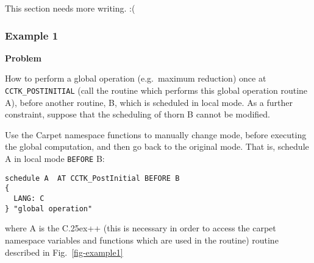 \documentclass{article}
\def\Cplusplus{\hbox{C\raise.25ex\hbox{\footnotesize ++}}}
\begin{document}
This section needs more writing. :(

\subsubsection{Example 1}

{\bf Problem}

How to perform a global operation (e.g.\ maximum reduction) once at \verb|CCTK_POSTINITIAL| (call the
routine which performs this global operation routine A), before another routine, B, which is scheduled in local mode. As a further
constraint, suppose that the scheduling of thorn B cannot be modified.\\


Use the Carpet namespace functions to manually change mode, before executing the global computation,
and then go back to the original mode. That is, schedule A in local mode \verb|BEFORE| B:

\begin{verbatim}
schedule A  AT CCTK_PostInitial BEFORE B
{
  LANG: C
} "global operation"
\end{verbatim}

where A is the \Cplusplus{} (this is necessary in order to access the carpet namespace variables
and functions which are used in the routine) routine described in Fig.~\ref{fig-example1}
\end{document}
